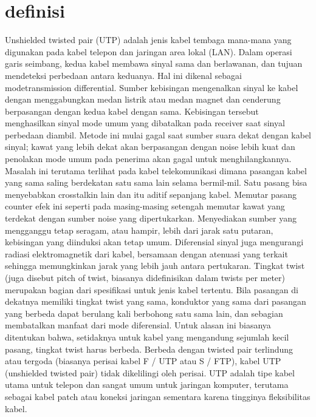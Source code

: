 \section{definisi}
Unshielded twisted pair (UTP) adalah jenis kabel tembaga mana-mana yang digunakan pada kabel telepon dan jaringan area lokal (LAN).
Dalam operasi garis seimbang, kedua kabel membawa sinyal sama dan berlawanan, dan tujuan mendeteksi perbedaan antara keduanya. Hal 
ini dikenal sebagai modetransmission differential. Sumber kebisingan mengenalkan sinyal ke kabel dengan menggabungkan medan listrik 
atau medan magnet dan cenderung berpasangan dengan kedua kabel dengan sama. Kebisingan tersebut menghasilkan sinyal mode umum yang 
dibatalkan pada receiver saat sinyal perbedaan diambil. Metode ini mulai gagal saat sumber suara dekat dengan kabel sinyal; kawat 
yang lebih dekat akan berpasangan dengan noise lebih kuat dan penolakan mode umum pada penerima akan gagal untuk menghilangkannya. 
Masalah ini terutama terlihat pada kabel telekomunikasi dimana pasangan kabel yang sama saling berdekatan satu sama lain selama 
bermil-mil. Satu pasang bisa menyebabkan crosstalkin lain dan itu aditif sepanjang kabel. Memutar pasang counter efek ini seperti 
pada masing-masing setengah memutar kawat yang terdekat dengan sumber noise yang dipertukarkan. Menyediakan sumber yang mengganggu 
tetap seragam, atau hampir, lebih dari jarak satu putaran, kebisingan yang diinduksi akan tetap umum. Diferensial sinyal juga mengurangi 
radiasi elektromagnetik dari kabel, bersamaan dengan atenuasi yang terkait sehingga memungkinkan jarak yang lebih jauh antara pertukaran. 
Tingkat twist (juga disebut pitch of twist, biasanya didefinisikan dalam twists per meter) merupakan bagian dari spesifikasi untuk jenis 
kabel tertentu. Bila pasangan di dekatnya memiliki tingkat twist yang sama, konduktor yang sama dari pasangan yang berbeda dapat berulang 
kali berbohong satu sama lain, dan sebagian membatalkan manfaat dari mode diferensial. Untuk alasan ini biasanya ditentukan bahwa, setidaknya 
untuk kabel yang mengandung sejumlah kecil pasang, tingkat twist harus berbeda. Berbeda dengan twisted pair terlindung atau tergoda (biasanya 
perisai kabel F / UTP atau S / FTP), kabel UTP (unshielded twisted pair) tidak dikelilingi oleh perisai. UTP adalah tipe kabel utama untuk 
telepon dan sangat umum untuk jaringan komputer, terutama sebagai kabel patch atau koneksi jaringan sementara karena tingginya fleksibilitas kabel.

